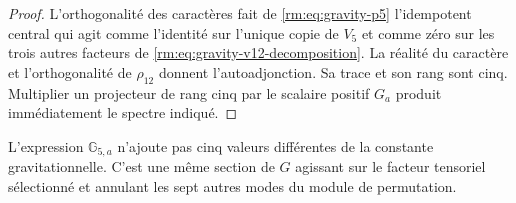 \begin{proof}
L’orthogonalité des caractères fait de \cref{rm:eq:gravity-p5}
l’idempotent central qui agit comme l’identité sur l’unique copie de
\(V_5\) et comme zéro sur les trois autres facteurs de
\cref{rm:eq:gravity-v12-decomposition}. La réalité du caractère et
l’orthogonalité de \(\rho_{12}\) donnent l’autoadjonction. Sa trace et son rang
sont cinq. Multiplier un projecteur de rang cinq par le scalaire positif
\(G_a\) produit immédiatement le spectre indiqué.
\end{proof}

L’expression \(\mathbb G_{5,a}\) n’ajoute pas cinq valeurs différentes de la constante gravitationnelle. C’est une même section de \(G\) agissant sur le facteur tensoriel sélectionné et annulant les sept autres modes du module de permutation.
